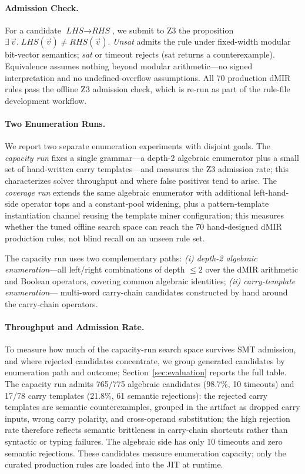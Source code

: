 \paragraph{Admission Check.} For a candidate $\textit{LHS} \to
\textit{RHS}$, we submit to Z3 the proposition $\exists\,\vec{v}.\;
\textit{LHS}(\vec{v}) \neq \textit{RHS}(\vec{v})$. \emph{Unsat} admits
the rule under fixed-width modular bit-vector semantics; \emph{sat} or
timeout rejects (sat returns a counterexample). Equivalence assumes
nothing beyond modular arithmetic---no signed interpretation and no
undefined-overflow assumptions. All 70 production dMIR rules pass the
offline Z3 admission check, which is re-run as part of the rule-file
development workflow.

\paragraph{Two Enumeration Runs.} We report two separate enumeration
experiments with disjoint goals. The \emph{capacity run} fixes a single
grammar---a depth-2 algebraic enumerator plus a small set of
hand-written carry templates---and measures the Z3 admission rate; this
characterizes solver throughput and where false positives tend to arise.
The \emph{coverage run} extends the same algebraic enumerator with
additional left-hand-side operator tops and a constant-pool widening,
plus a pattern-template instantiation channel reusing the template miner
configuration; this measures whether the tuned offline search space can
reach the 70 hand-designed dMIR production rules, not blind recall on an
unseen rule set.

The capacity run uses two complementary paths: \emph{(i) depth-2
algebraic enumeration}---all left/right combinations of depth $\le\!2$
over the dMIR arithmetic and Boolean operators, covering common
algebraic identities; \emph{(ii) carry-template enumeration}---%
multi-word carry-chain candidates constructed by hand around the
carry-chain operators.

\paragraph{Throughput and Admission Rate.} To measure how much of the
capacity-run search space survives SMT admission, and where rejected
candidates concentrate, we group generated candidates by enumeration path
and outcome; Section~\ref{sec:evaluation} reports the full table. The
capacity run admits 765/775 algebraic candidates (98.7\%, 10 timeouts)
and 17/78 carry templates (21.8\%, 61 semantic rejections):
the rejected carry templates are semantic counterexamples, grouped in
the artifact as dropped carry inputs, wrong carry polarity, and
cross-operand substitution; the high rejection rate therefore reflects
semantic brittleness in carry-chain shortcuts rather than syntactic or
typing failures. The algebraic side has only 10 timeouts and zero semantic
rejections. These candidates measure enumeration capacity; only the
curated production rules are loaded into the JIT at runtime.


